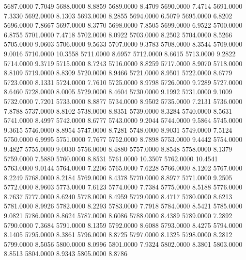 5687.0000      7.7049
5688.0000      8.8859
5689.0000      8.4709
5690.0000      7.4714
5691.0000      7.3330
5692.0000      8.1303
5693.0000      8.2855
5694.0000      6.5079
5695.0000      6.8202
5696.0000      7.8667
5697.0000      8.3770
5698.0000      7.8505
5699.0000      6.9522
5700.0000      6.8755
5701.0000      7.4718
5702.0000      8.0922
5703.0000      8.2502
5704.0000      8.5266
5705.0000      9.0603
5706.0000      9.5633
5707.0000      9.3783
5708.0000      8.3544
5709.0000      9.0016
5710.0000     10.3558
5711.0000      8.6957
5712.0000      8.6615
5713.0000      9.2822
5714.0000      9.3719
5715.0000      8.7243
5716.0000      8.8259
5717.0000      8.9070
5718.0000      8.8109
5719.0000      8.8309
5720.0000      8.9466
5721.0000      8.9501
5722.0000      8.6779
5723.0000      8.1331
5724.0000      7.7610
5725.0000      8.9798
5726.0000      9.7289
5727.0000      8.6460
5728.0000      8.0005
5729.0000      8.4604
5730.0000      9.1992
5731.0000      9.1009
5732.0000      7.7201
5733.0000      8.8877
5734.0000      8.9502
5735.0000      7.2131
5736.0000      7.8788
5737.0000      8.8102
5738.0000      8.8351
5739.0000      8.3284
5740.0000      8.5631
5741.0000      8.4997
5742.0000      8.6777
5743.0000      9.2044
5744.0000      9.5864
5745.0000      9.3615
5746.0000      8.8954
5747.0000      8.7281
5748.0000      8.9031
5749.0000      7.5124
5750.0000      6.9995
5751.0000      7.7677
5752.0000      8.7898
5753.0000      9.4442
5754.0000      9.4827
5755.0000      9.0030
5756.0000      8.4880
5757.0000      8.8548
5758.0000      8.1379
5759.0000      7.5880
5760.0000      8.8531
5761.0000     10.3507
5762.0000     10.4541
5763.0000      9.0144
5764.0000      7.2206
5765.0000      7.6228
5766.0000      8.1202
5767.0000      8.2249
5768.0000      8.2184
5769.0000      8.4378
5770.0000      8.8977
5771.0000      9.2505
5772.0000      8.9603
5773.0000      7.6123
5774.0000      7.7384
5775.0000      8.5188
5776.0000      8.7637
5777.0000      8.6240
5778.0000      8.4959
5779.0000      8.4717
5780.0000      8.6213
5781.0000      8.9926
5782.0000      8.2293
5783.0000      7.7918
5784.0000      8.5421
5785.0000      9.0821
5786.0000      8.8624
5787.0000      8.6086
5788.0000      8.4389
5789.0000      7.2892
5790.0000      7.3684
5791.0000      8.1359
5792.0000      8.6088
5793.0000      8.4275
5794.0000      8.1405
5795.0000      8.3861
5796.0000      8.8725
5797.0000      8.1325
5798.0000      8.2812
5799.0000      8.5056
5800.0000      8.0996
5801.0000      7.9324
5802.0000      8.3801
5803.0000      8.8513
5804.0000      8.9343
5805.0000      8.8786
